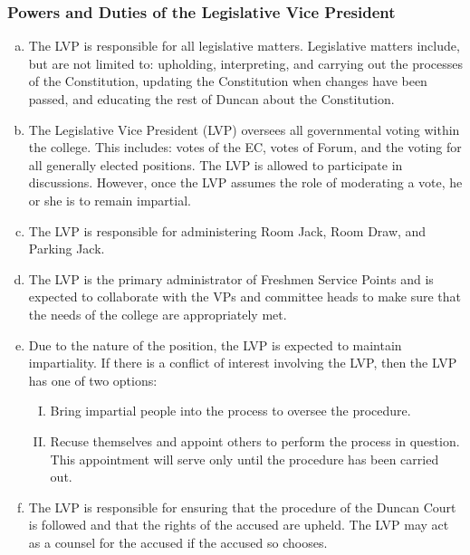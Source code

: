 \documentclass[USletter,12pt]{article}
\begin{document}
\subsubsection{Powers and Duties of the Legislative Vice President}
\begin{enumerate}[(a)]
\item The LVP is responsible for all legislative matters.  Legislative matters include, but are not limited to: upholding, interpreting, and carrying out the processes of the Constitution, updating the Constitution when changes have been passed, and educating the rest of Duncan about the Constitution.
\item The Legislative Vice President (LVP) oversees all governmental voting within the college.  This includes: votes of the EC, votes of Forum, and the voting for all generally elected positions.  The LVP is allowed to participate in discussions.  However, once the LVP assumes the role of moderating a vote, he or she is to remain impartial.
\item The LVP is responsible for administering Room Jack, Room Draw, and Parking Jack.
\item The LVP is the primary administrator of Freshmen Service Points and is expected to collaborate with the VPs and committee heads to make sure that the needs of the college are appropriately met.
\item Due to the nature of the position, the LVP is expected to maintain impartiality.  If there is a conflict of interest involving the LVP, then the LVP has one of two options:
	\begin{enumerate}[(I)]
	\item Bring impartial people into the process to oversee the procedure.
	\item Recuse themselves and appoint others to perform the process in question.  This appointment will serve only until the procedure has been carried out.
	\end{enumerate}
\item The LVP is responsible for ensuring that the procedure of the Duncan Court is followed and that the rights of the accused are upheld.  The LVP may act as a counsel for the accused if the accused so chooses.
\end{enumerate}
\end{document}
